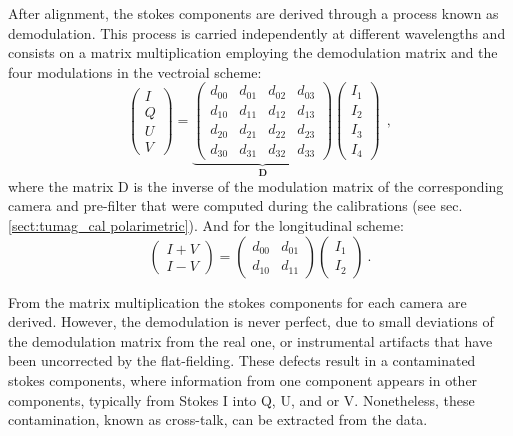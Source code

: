 After alignment, the stokes components are derived through a process known as demodulation. This process is carried independently at different wavelengths and consists on a matrix multiplication employing the demodulation matrix and the four modulations in the vectroial scheme:
\begin{equation}
  \begin{pmatrix}
  I \\
  Q \\
  U \\
  V
  \end{pmatrix} = 
  \underbrace{\begin{pmatrix} 
      d _ {00} & d _ {01} & d _ {02} & d _ {03} \\ 
      d _ {10} & d _ {11} & d _ {12} & d _ {13} \\
      d _ {20} & d _ {21} & d _ {22} & d _ {23} \\
      d _ {30} & d _ {31} & d _ {32} & d _ {33} 
  \end{pmatrix}}_ {\textbf{D}}
  \begin{pmatrix}
    I _ {1} \\
    I _ {2} \\
    I _ {3} \\
    I _ {4}
    \end{pmatrix} \ \ , 
    \label{pipeline: Demod}
\end{equation}
where the matrix D is the inverse of the modulation matrix of the corresponding camera and pre-filter that were computed during the calibrations (see sec. \ref{sect:tumag_cal polarimetric}). And for the longitudinal scheme:
\begin{equation}
  \begin{pmatrix}
  I + V\\
  I - V
  \end{pmatrix} = 
  \begin{pmatrix} 
      d _ {00} & d _ {01} \\ 
      d _ {10} & d _ {11}
  \end{pmatrix}
  \begin{pmatrix}
    I _ {1} \\
    I _ {2} 
  \end{pmatrix} \ .
    \label{pipeline: Demod_long}
\end{equation}

From the matrix multiplication the stokes components for each camera are derived. However, the demodulation is never perfect, due to small deviations of the demodulation matrix from the real one, or instrumental artifacts that have been uncorrected by the flat-fielding. These defects result in a contaminated stokes components, where information from one component appears in other components, typically from Stokes I into Q, U, and or V. Nonetheless, these contamination, known as cross-talk, can be extracted from the data. 

